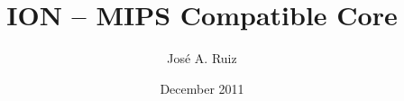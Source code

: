 \documentclass[12pt,a4paper]{memoir}
\begin{document}
\title{ION -- MIPS Compatible Core} 
\author{José A. Ruiz} 
\date{December 2011}
\maketitle
\tableofcontents
\listoffigures
\listoftables


%








 
%
 
\clearpage

 
\end{document}
